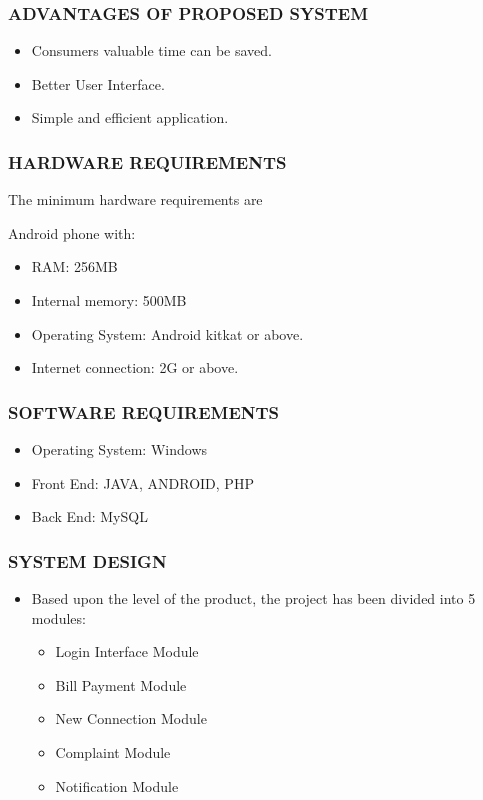 \documentclass{beamer} %
\theoremstyle{definition} %
\begin{document}
\begin{frame}
\frametitle{ADVANTAGES OF PROPOSED SYSTEM}
\begin{itemize}
		\item  Consumers valuable time can be saved.
		\item Better User Interface.
		\item Simple and efficient application.
\end{itemize}
\end{frame}
\begin{frame}
\frametitle {HARDWARE REQUIREMENTS}
 The minimum hardware requirements are
 \par 
 Android phone with:
\begin{itemize}

	\item  RAM: 256MB
	\item Internal memory: 500MB
	\item Operating System: Android kitkat or above.
	\item Internet connection: 2G or above.
	
	
	
\end{itemize}
\end{frame}
\begin{frame}
\frametitle {SOFTWARE REQUIREMENTS }
\begin{itemize}
	\item  Operating System: Windows
	\item  Front End: JAVA, ANDROID, PHP
	\item  Back End: MySQL
	
	
\end{itemize}
\end{frame}

\begin{frame}
\frametitle{SYSTEM DESIGN }
\begin{itemize}
\item Based upon the level of the product, the project has been divided into 5 modules:
\begin{itemize}
	\item Login Interface Module
	\item Bill Payment Module
	\item New Connection Module
	\item Complaint Module
	\item Notification Module
\end{itemize}
\end{itemize}
\end{frame}
\end{document}
